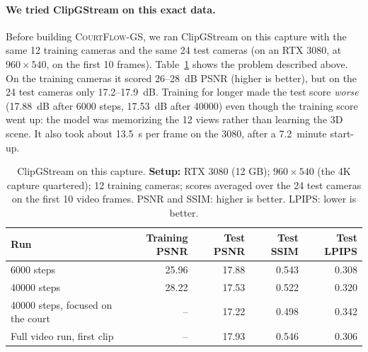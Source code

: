 \documentclass[11pt]{article}
\newcommand{\method}{\textsc{CourtFlow-GS}\xspace}
\begin{document}
\paragraph{We tried ClipGStream on this exact data.}
Before building \method, we ran ClipGStream on this capture with the same 12 training cameras and
the same 24 test cameras (on an RTX 3080, at $960\times540$, on the first 10 frames).
Table~\ref{tab:clipgstream} shows the problem described above. On the training cameras it scored
26--28~dB PSNR (higher is better), but on the 24 test cameras only 17.2--17.9~dB. Training for
longer made the test score \emph{worse} (17.88~dB after 6000 steps, 17.53~dB after 40000) even
though the training score went up: the model was memorizing the 12 views rather than learning the
3D scene. It also took about 13.5~s per frame on the 3080, after a 7.2~minute start-up.
\begin{table}[!htbp]\centering
\caption{ClipGStream on this capture. \textbf{Setup:} RTX 3080 (12 GB); $960\times540$ (the 4K capture
quartered); 12 training cameras; scores averaged over the 24 test cameras on the first 10 video frames.
PSNR and SSIM: higher is better. LPIPS: lower is better.}\label{tab:clipgstream}
\small\begin{tabular}{lrrrr}\toprule
Run & Training PSNR & Test PSNR & Test SSIM & Test LPIPS \\\midrule
6000 steps & 25.96 & 17.88 & 0.543 & 0.308 \\
40000 steps & 28.22 & 17.53 & 0.522 & 0.320 \\
40000 steps, focused on the court & -- & 17.22 & 0.498 & 0.342 \\
Full video run, first clip & -- & 17.93 & 0.546 & 0.306 \\\bottomrule
\end{tabular}\end{table}
\end{document}
